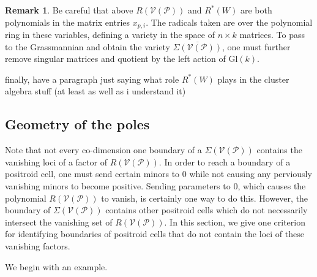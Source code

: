 \documentclass[11pt]{article}
\newcommand{\cP}{\mathcal{P}}
\newcommand{\cV}{\mathcal{V}}
\newcommand{\VP}{\cV(\cP)}
\newtheorem{thm}{Theorem}[section]
\theoremstyle{remark}
\theoremstyle{definition}
\newtheorem{rmk}[thm]{Remark}
\begin{document}
\begin{rmk}
Be careful that above $R(\VP)$ and $R^{\ast}(W)$ are both polynomials in the matrix entries $x_{p,i}$. The radicals taken are over the polynomial ring in these variables, defining a variety in the space of $n \times k$ matrices. To pass to the Grassmannian and obtain the variety $\overline{\Sigma(\VP)}$, one must further remove singular matrices and quotient by the left action of $\mathrm{Gl}(k)$. 
\end{rmk}

{\color{red} finally, have a paragraph just saying what role $R^{\ast}(W)$ plays in the cluster algebra stuff (at least as well as i understand it)}


\subsection{Geometry of the poles\label{sec:boundarysanspoles}}

Note that not every co-dimension one boundary of a $\Sigma(\VP)$ contains the vanishing loci of a factor of $R(\VP)$. In order to reach a boundary of a positroid cell, one must send certain minors to 0 while not causing any perviously vanishing minors to become positive. Sending parameters to $0$, which causes the polynomial $R(\VP)$ to vanish, is certainly one way to do this. However, the boundary of $\Sigma(\VP)$ contains other positroid cells which do not necessarily intersect the vanishing set of $R(\VP)$. In this section, we give one criterion for identifying boundaries of positroid cells that do not contain the loci of these vanishing factors. 

We begin with an example. 
\end{document}
